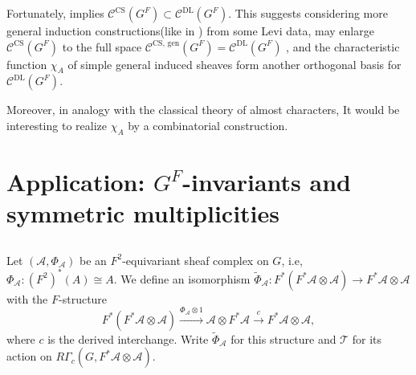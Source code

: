 \documentclass[11pt,letterpaper]{amsart}
\theoremstyle{definition}
\numberwithin{equation}{section}
\numberwithin{theorem}{section}
\begin{document}
Fortunately,  implies
$
\mathcal C^{\mathrm{CS}}(G^F)
\subset
\mathcal C^{\mathrm{DL}}(G^F).
$
This suggests considering more general induction constructions(like in \cite{Lus_Ch2}) from some Levi data, may enlarge $\mathcal C^{\mathrm{CS}}(G^F)$ to the full space
$
\mathcal C^{\mathrm{CS},\,\mathrm{gen}}(G^F)
=
\mathcal C^{\mathrm{DL}}(G^F)
$
, and the characteristic function $\chi_A$ of simple general induced sheaves form another orthogonal basis for $\mathcal C^{\mathrm{DL}}(G^F)$.

Moreover, in analogy with the classical theory of almost characters, It would be interesting to realize $\chi_A$ by a combinatorial construction.



\section{Application: $G^F$-invariants and symmetric multiplicities}
\label{quad}

\subsection{}
Let $(\mathcal A,\Phi_{\mathcal A})$ be an $F^2$-equivariant sheaf complex on
$G$, i.e, $\Phi_{\mathcal A}:(F^2)^*(A)\cong A$. We define an isomorphism $\widetilde\Phi_{\mathcal A}:F^*(F^*\mathcal A\otimes\mathcal A)\to F^*\mathcal A\otimes\mathcal A$ with
the $F$-structure
\begin{equation}\label{swap}
 F^*(F^*\mathcal A\otimes\mathcal A)
 \xrightarrow{\Phi_{\mathcal A}\otimes1}
 \mathcal A\otimes F^*\mathcal A
 \xrightarrow{c}F^*\mathcal A\otimes\mathcal A,
\end{equation}
where $c$ is the derived interchange. Write
$\widetilde\Phi_{\mathcal A}$ for this structure and $\mathcal T$
for its action on $R\Gamma_c(G,F^*\mathcal A\otimes\mathcal A)$.
\end{document}
